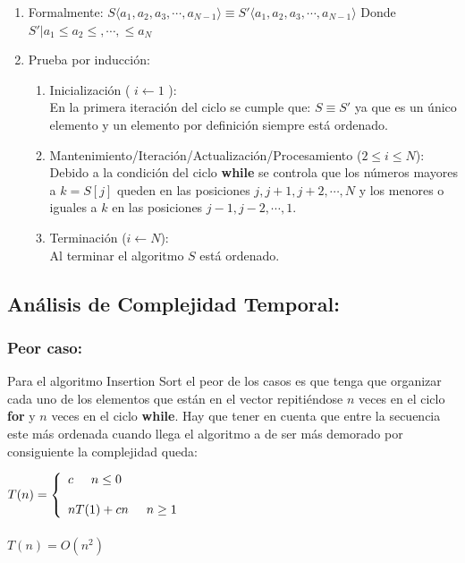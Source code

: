 \documentclass[12pt,spanish]{article}
\theoremstyle{definition}
\begin{document}
\begin{enumerate}
\item Formalmente: $S \left.\langle a_{1}, a_{2}, a_{3}, \cdots, a_{N-1} \rangle\right. \equiv S' \left.\langle a_{1}, a_{2}, a_{3}, \cdots, a_{N-1} \rangle\right. $
Donde $S' | a_{1} \le a_{2} \le, \cdots, \le a_{N} $

\item Prueba por inducción:
    \begin{enumerate}
    \item Inicialización ( $i \leftarrow 1 $ ):\\
        En la primera iteración del ciclo se cumple que: $ S \equiv S' $ ya que es un único elemento y un elemento por definición siempre está ordenado. 
    \item Mantenimiento/Iteración/Actualización/Procesamiento  ($ 2  \le i  \le N $):\\
        Debido a la condición del ciclo \textbf{while} se controla que los números mayores a $k = S[j]$ queden en las posiciones $ j, j + 1, j+2, \cdots, N $ y los menores o iguales a $k$ en las posiciones $j-1, j-2, \cdots, 1$.
    \item Terminación ($ i \leftarrow N $): \\
        Al terminar el algoritmo $S$ está ordenado.
    \end{enumerate}
\end{enumerate}

\subsection{ Análisis de Complejidad Temporal:}
\subsubsection{Peor caso:}{}
Para el algoritmo Insertion Sort el peor de los casos es que tenga que organizar cada uno de los elementos que están en el vector repitiéndose $n$ veces en el ciclo \textbf{for} y $n$ veces en el  ciclo \textbf{while}. Hay que tener en cuenta que entre la secuencia este más ordenada cuando llega el algoritmo a de ser más demorado por consiguiente la complejidad queda:

$T(n)= \left\{ \begin{array}{lcc}
              c \hspace{0.5cm}  n \leq 0 \\
              \\ nT(1) +cn \hspace{0.5cm} n \geq 1 \\
              \end{array}
    \right.$ \\ \\
$T(n) = O(n^{2})$
\end{document}
